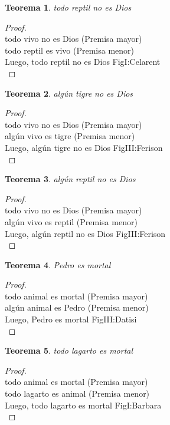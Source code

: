 ﻿\documentclass[12pt]{book}
\newtheorem{theorem}{Teorema}[chapter]
\newtheorem{proof}{Demostración}
\begin{document}
\begin{theorem}
todo reptil no es Dios
\label{th: 91}
\end{theorem}\begin{proof}\\todo vivo no es Dios	 (Premisa mayor) \\todo reptil es vivo	 (Premisa menor) \\Luego, todo reptil no es Dios	FigI:Celarent \\ \end{proof}
\begin{theorem}
algún tigre no es Dios
\label{th: 92}
\end{theorem}\begin{proof}\\todo vivo no es Dios	 (Premisa mayor) \\algún vivo es tigre	 (Premisa menor) \\Luego, algún tigre no es Dios	FigIII:Ferison \\ \end{proof}
\begin{theorem}
algún reptil no es Dios
\label{th: 93}
\end{theorem}\begin{proof}\\todo vivo no es Dios	 (Premisa mayor) \\algún vivo es reptil	 (Premisa menor) \\Luego, algún reptil no es Dios	FigIII:Ferison \\ \end{proof}
\begin{theorem}
Pedro es mortal
\label{th: 94}
\end{theorem}\begin{proof}\\todo animal es mortal	 (Premisa mayor) \\algún animal es Pedro	 (Premisa menor) \\Luego, Pedro es mortal	FigIII:Datisi \\ \end{proof}
\begin{theorem}
todo lagarto es mortal
\label{th: 95}
\end{theorem}\begin{proof}\\todo animal es mortal	 (Premisa mayor) \\todo lagarto es animal	 (Premisa menor) \\Luego, todo lagarto es mortal	FigI:Barbara \\ \end{proof}
\end{document}
